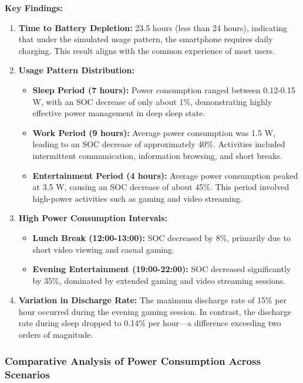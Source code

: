 \noindent \textbf{Key Findings:}
\begin{enumerate}[label=\arabic*), leftmargin=2\parindent]
    \item \textbf{Time to Battery Depletion:} 23.5 hours (less than 24 hours), indicating that under the simulated usage pattern, the smartphone requires daily charging. This result aligns with the common experience of most users.
    \item \textbf{Usage Pattern Distribution:}
    \begin{itemize}
        \item \textbf{Sleep Period (7 hours):} Power consumption ranged between 0.12-0.15 W, with an SOC decrease of only about 1\%, demonstrating highly effective power management in deep sleep state.
        \item \textbf{Work Period (9 hours):} Average power consumption was 1.5 W, leading to an SOC decrease of approximately 40\%. Activities included intermittent communication, information browsing, and short breaks.
        \item \textbf{Entertainment Period (4 hours):} Average power consumption peaked at 3.5 W, causing an SOC decrease of about 45\%. This period involved high-power activities such as gaming and video streaming.
    \end{itemize}
    \item \textbf{High Power Consumption Intervals:}
    \begin{itemize}
        \item \textbf{Lunch Break (12:00-13:00):} SOC decreased by 8\%, primarily due to short video viewing and casual gaming.
        \item \textbf{Evening Entertainment (19:00-22:00):} SOC decreased significantly by 35\%, dominated by extended gaming and video streaming sessions.
    \end{itemize}
    \item \textbf{Variation in Discharge Rate:} The maximum discharge rate of 15\% per hour occurred during the evening gaming session. In contrast, the discharge rate during sleep dropped to 0.14\% per hour—a difference exceeding two orders of magnitude.
\end{enumerate}

\subsubsection{Comparative Analysis of Power Consumption Across Scenarios}

